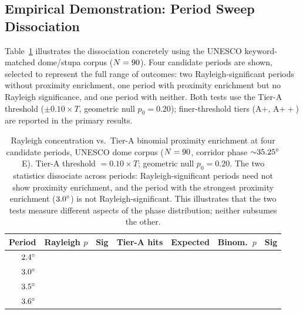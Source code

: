 \documentclass[12pt,a4paper]{article}
\newcommand{\degr}{\ifmmode^\circ\else\textdegree{}\fi}
\begin{document}
\subsection{Empirical Demonstration: Period Sweep Dissociation}

Table~\ref{tab:rayleigh_vs_binom} illustrates the dissociation
concretely using the UNESCO keyword-matched dome/stupa corpus
($N = 90{}$). Four candidate periods are shown,
selected to represent the full range of outcomes: two
Rayleigh-significant periods without proximity enrichment, one period
with proximity enrichment but no Rayleigh significance, and one period
with neither. Both tests use the Tier-A threshold
($\pm 0.10 \times T$, geometric null $p_0 = 0.20$); finer-threshold
tiers (A$+$, A$++$) are reported in the primary results.

\begin{table}[ht]
\centering
\caption{Rayleigh concentration vs.\ Tier-A binomial proximity
enrichment at four candidate periods, UNESCO dome corpus
($N = 90{}$, corridor phase ${\sim}35.25\degr$E).
Tier-A threshold $= 0.10 \times T$; geometric null $p_0 = 0.20$.
The two statistics dissociate across periods: Rayleigh-significant
periods need not show proximity enrichment, and the period with the
strongest proximity enrichment ($3.0\degr$) is not Rayleigh-significant.
This illustrates that the two tests measure different aspects of the
phase distribution; neither subsumes the other.}
\label{tab:rayleigh_vs_binom}
\small
\begin{tabular}{rlcrrrl}
\toprule
Period & Rayleigh $p$ & Sig & Tier-A hits & Expected
       & Binom.\ $p$ & Sig \\
\midrule
$2.4\degr$ & \sweepRayleighPTwoFour{}  & \sweepRayleighSigTwoFour{}
           & \sweepHitsTwoFour{}  & \sweepExpectedTwoFour{}
           & \sweepBinomPTwoFour{}  & \sweepBinomSigTwoFour{} \\
$3.0\degr$ & \sweepRayleighPThreeZero{} & \sweepRayleighSigThreeZero{}
           & \sweepHitsThreeZero{} & \sweepExpectedThreeZero{}
           & \sweepBinomPThreeZero{} & \textbf{\sweepBinomSigThreeZero{}} \\
$3.5\degr$ & \sweepRayleighPThreeFive{} & \sweepRayleighSigThreeFive{}
           & \sweepHitsThreeFive{} & \sweepExpectedThreeFive{}
           & \sweepBinomPThreeFive{} & \sweepBinomSigThreeFive{} \\
$3.6\degr$ & \sweepRayleighPThreeSix{}  & \sweepRayleighSigThreeSix{}
           & \sweepHitsThreeSix{}  & \sweepExpectedThreeSix{}
           & \sweepBinomPThreeSix{}  & \sweepBinomSigThreeSix{} \\
\bottomrule
\end{tabular}
\end{table}
\end{document}
